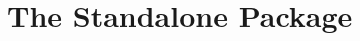 \documentclass[float=false, crop=false, class=report, a4, 12pt, onesided]{standalone}
\begin{document}
\chapter{The Standalone Package}\label{cha:standalone}
\end{document}
